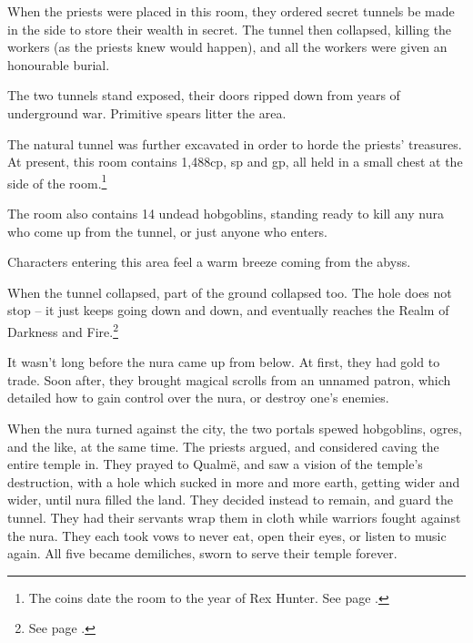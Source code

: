 \begin{multicols}{2}

\begin{exampletext}

When the priests were placed in this room, they ordered secret tunnels be made in the side to store their wealth in secret.
The tunnel then collapsed, killing the workers (as the priests knew would happen), and all the workers were given an honourable burial.

\end{exampletext}

The two tunnels stand exposed, their doors ripped down from years of underground war.  Primitive spears litter the area.


The natural tunnel was further excavated in order to horde the priests' treasures.
At present, this room contains 1,488cp, \thepage sp and  gp, all held in a small chest at the side of the room.\footnote{The coins date the room to the year of Rex Hunter.
See page \pageref{r_hunter}.}

The room also contains 14 undead hobgoblins, standing ready to kill any nura who come up from the tunnel, or just anyone who enters.


\undeadhobgoblin


Characters entering this area feel a warm breeze coming from the abyss.

\begin{exampletext}

When the tunnel collapsed, part of the ground collapsed too.  The hole does not stop -- it just keeps going down and down, and eventually reaches the Realm of Darkness and Fire.\footnote{See page \pageref{darknessandfire}.}

It wasn't long before the nura came up from below.  At first, they had gold to trade.  Soon after, they brought magical scrolls from an unnamed patron, which detailed how to gain control over the nura, or destroy one's enemies.

When the nura turned against the city, the two portals spewed hobgoblins, ogres, and the like, at the same time.
The priests argued, and considered caving the entire temple in.
They prayed to Qualm\"{e}, and saw a vision of the temple's destruction, with a hole which sucked in more and more earth, getting wider and wider, until nura filled the land.
They decided instead to remain, and guard the tunnel.
They had their servants wrap them in cloth while warriors fought against the nura.
They each took vows to never eat, open their eyes, or listen to music again.
All five became demiliches, sworn to serve their temple forever.


\end{exampletext}
\end{multicols}
